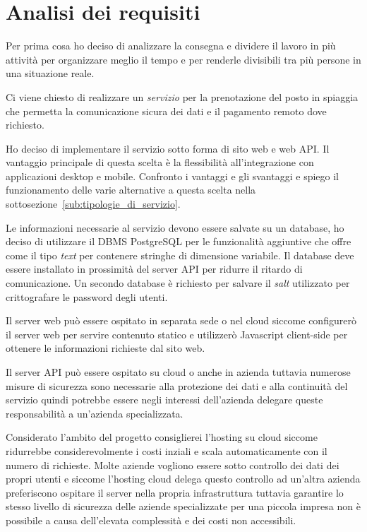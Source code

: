 \section{Analisi dei requisiti}
Per prima cosa ho deciso di analizzare la consegna e dividere il lavoro in pi\`u attivit\`a per organizzare meglio il tempo e per renderle divisibili tra pi\`u persone in una situazione reale.

Ci viene chiesto di realizzare un \emph{servizio} per la prenotazione del posto in spiaggia che permetta la comunicazione sicura dei dati e il pagamento remoto dove richiesto.


Ho deciso di implementare il servizio sotto forma di sito web e web API\@. Il vantaggio principale di questa scelta \`e la flessibilit\`a all'integrazione con applicazioni desktop e mobile. Confronto i vantaggi e gli svantaggi e spiego il funzionamento delle varie alternative a questa scelta nella sottosezione~\ref{sub:tipologie_di_servizio}.

Le informazioni necessarie al servizio devono essere salvate su un database, ho deciso di utilizzare il DBMS PostgreSQL per le funzionalit\`a aggiuntive che offre come il tipo \emph{text} per contenere stringhe di dimensione variabile. Il database deve essere installato in prossimit\`a del server API per ridurre il ritardo di comunicazione. Un secondo database \`e richiesto per salvare il \emph{salt} utilizzato per crittografare le password degli utenti.

Il server web pu\`o essere ospitato in separata sede o nel cloud siccome configurer\`o il server web per servire contenuto statico e utilizzer\`o Javascript client-side per ottenere le informazioni richieste dal sito web.

Il server API pu\`o essere ospitato su cloud o anche in azienda tuttavia numerose misure di sicurezza sono necessarie alla protezione dei dati e alla continuit\`a del servizio quindi potrebbe essere negli interessi dell'azienda delegare queste responsabilit\`a a un'azienda specializzata.

Considerato l'ambito del progetto consiglierei l'hosting su cloud siccome ridurrebbe considerevolmente i costi inziali e scala automaticamente con il numero di richieste. Molte aziende vogliono essere sotto controllo dei dati dei propri utenti e siccome l'hosting cloud delega questo controllo ad un'altra azienda preferiscono ospitare il server nella propria infrastruttura tuttavia garantire lo stesso livello di sicurezza delle aziende specializzate per una piccola impresa non \`e possibile a causa dell'elevata complessit\`a e dei costi non accessibili.

